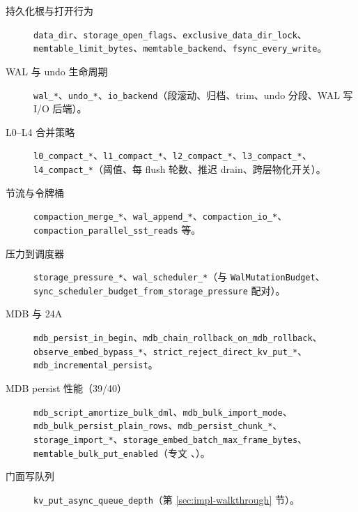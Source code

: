 \begin{description}
  \item[持久化根与打开行为] \texttt{data\_dir}、\texttt{storage\_open\_flags}、\texttt{exclusive\_data\_dir\_lock}、\texttt{memtable\_limit\_bytes}、\texttt{memtable\_backend}、\texttt{fsync\_every\_write}。
  \item[WAL 与 undo 生命周期] \texttt{wal\_*}、\texttt{undo\_*}、\texttt{io\_backend}（段滚动、归档、trim、undo 分段、WAL 写 I/O 后端）。
  \item[L0--L4 合并策略] \texttt{l0\_compact\_*}、\texttt{l1\_compact\_*}、\texttt{l2\_compact\_*}、\texttt{l3\_compact\_*}、\texttt{l4\_compact\_*}（阈值、每 flush 轮数、推迟 drain、跨层物化开关）。
  \item[节流与令牌桶] \texttt{compaction\_merge\_*}、\texttt{wal\_append\_*}、\texttt{compaction\_io\_*}、\texttt{compaction\_parallel\_sst\_reads} 等。
  \item[压力到调度器] \texttt{storage\_pressure\_*}、\texttt{wal\_scheduler\_*}（与 \texttt{WalMutationBudget}、\texttt{sync\_scheduler\_budget\_from\_storage\_pressure} 配对）。
  \item[MDB 与 24A] \texttt{mdb\_persist\_in\_begin}、\texttt{mdb\_chain\_rollback\_on\_mdb\_rollback}、\texttt{observe\_embed\_bypass\_*}、\texttt{strict\_reject\_direct\_kv\_put\_*}、\texttt{mdb\_incremental\_persist}。
  \item[MDB persist 性能（39/40）] \texttt{mdb\_script\_amortize\_bulk\_dml}、\texttt{mdb\_bulk\_import\_mode}、\texttt{mdb\_bulk\_persist\_plain\_rows}、\texttt{mdb\_persist\_chunk\_*}、\texttt{storage\_import\_*}、\texttt{storage\_embed\_batch\_max\_frame\_bytes}、\texttt{memtable\_bulk\_put\_enabled}（专文 、）。
  \item[门面写队列] \texttt{kv\_put\_async\_queue\_depth}（第 \ref{sec:impl-walkthrough} 节）。
\end{description}

